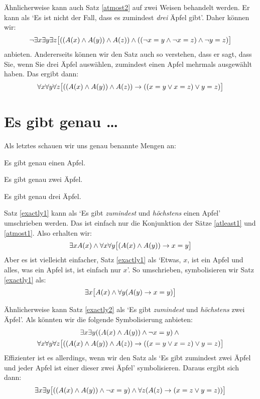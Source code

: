 Ähnlicherweise kann auch Satz \ref{atmost2} auf zwei Weisen behandelt werden. Er kann als `Es ist nicht der Fall, dass es zumindest \emph{drei} Äpfel gibt'. Daher können wir:
$$\neg \exists x \exists y\exists z\bigl[((\mathord{A}(x) \wedge \mathord{A}(y)) \wedge \mathord{A}(z)) \wedge ((\neg x = y \wedge \neg x = z) \wedge \neg y = z)\bigr]$$
anbieten. Andererseits können wir den Satz auch so verstehen, dass er sagt, dass Sie, wenn Sie drei Äpfel auswählen, zumindest einen Apfel mehrmals ausgewählt haben. Das ergibt dann:
$$\forall x\forall y\forall z\bigl[((\mathord{A}(x) \wedge \mathord{A}(y)) \wedge \mathord{A}(z)) \rightarrow ((x=y \vee x=z) \vee y=z)\bigr]$$


\section{Es gibt genau \ldots}\label{sec:exactlyn}
Als letztes schauen wir uns genau benannte Mengen an: 
\begin{earg}
\item[\ex{exactly1}] Es gibt genau einen Apfel.
\item[\ex{exactly2}] Es gibt genau zwei Äpfel.
\item[\ex{exactly3}] Es gibt genau drei Äpfel.
\end{earg}
Satz \ref{exactly1} kann als `Es gibt \emph{zumindest} und \emph{höchstens} einen Apfel' umschrieben werden. Das ist einfach nur die Konjunktion der Sätze \ref{atleast1} und \ref{atmost1}. Also erhalten wir:
$$\exists x \mathord{A}(x) \wedge \forall x\forall y\bigl[(\mathord{A}(x) \wedge \mathord{A}(y)) \rightarrow x=y\bigr]$$
Aber es ist vielleicht einfacher, Satz \ref{exactly1} als `Etwas, $x$, ist ein Apfel und alles, was ein Apfel ist, ist einfach nur $x$'. So umschrieben, symbolisieren wir Satz \ref{exactly1} als: 
\[
	\exists x\bigl[\mathord{A}(x) \wedge \forall y(\mathord{A}(y) \rightarrow x= y)\bigr]
\]

Ähnlicherweise kann Satz \ref{exactly2} als `Es gibt \emph{zumindest} und \emph{höchstens} zwei Äpfel'. Als könnten wir die folgende Symbolisierung anbieten:
\begin{multline*}
  \exists x \exists y((\mathord{A}(x) \wedge \mathord{A}(y)) \wedge \neg x = y) \wedge {}\\
  \forall x\forall y\forall z\bigl[((\mathord{A}(x) \wedge \mathord{A}(y)) \wedge \mathord{A}(z)) \rightarrow ((x=y \vee x=z) \vee y=z)\bigr]
\end{multline*}
Effizienter ist es allerdings, wenn wir den Satz als `Es gibt zumindest zwei Äpfel und jeder Apfel ist einer dieser zwei Äpfel' symbolisieren. Daraus ergibt sich dann:
$$\exists x\exists y\bigl[((\mathord{A}(x) \wedge \mathord{A}(y)) \wedge \neg x = y) \wedge \forall z(\mathord{A}(z) \rightarrow ( x = z \vee y = z))\bigr]$$

